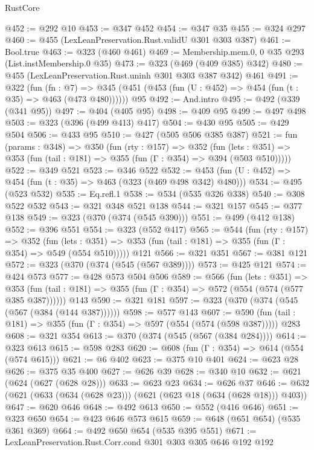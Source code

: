 \begin{lexlean}{RustCore}
\begin{coremodule}
@452 := @292 @10
@453 := @347 @452
@454 := @347 @35
@455 := @324 @297
@460 := @455 (LexLeanPreservation.Rust.validU @301 @303 @387)
@461 := Bool.true
@463 := @323 (@460 @461)
@469 := Membership.mem.{0, 0} @35 @293 (List.instMembership.{0} @35)
@473 := @323 (@469 (@409 @385) @342)
@480 := @455 (LexLeanPreservation.Rust.uninh @301 @303 @387 @342) @461
@491 := @322
    (fun (fn : @7) =>
    @345 (@451 (@453 (fun (U : @452) => @454 (fun (t : @35) => @463 (@473 @480))))))
    @95
@492 := And.intro
@495 := @492 (@339 (@341 @95))
@497 := @404 (@405 @95)
@498 := @409 @95
@499 := @497 @498
@503 := @323 (@396 (@499 @413) @417)
@504 := @430 @95
@505 := @429 @504
@506 := @433 @95
@510 := @427 (@505 @506 @385 @387)
@521 := fun (params : @348) =>
  @350
    (fun (rty : @157) =>
    @352
      (fun (lets : @351) => @353 (fun (tail : @181) => @355 (fun (Γ : @354) => @394 (@503 @510)))))
@522 := @349 @521
@523 := @346 @522
@532 := @453 (fun (U : @452) => @454 (fun (t : @35) => @463 (@323 (@469 @498 @342) @480)))
@534 := @495 (@523 @532)
@535 := Eq.refl.{1}
@538 := @534 (@535 @326 @338)
@540 := @308 @522 @532
@543 := @321 @348 @521 @138
@544 := @321 @157
@545 := @377 @138
@549 := @323 (@370 (@374 (@545 @390)))
@551 := @499 (@412 @138)
@552 := @396 @551
@554 := @323 (@552 @417)
@565 := @544
    (fun (rty : @157) =>
    @352
      (fun (lets : @351) => @353 (fun (tail : @181) => @355 (fun (Γ : @354) => @549 (@554 @510)))))
    @121
@566 := @321 @351
@567 := @381 @121
@572 := @323 (@370 (@374 (@545 (@567 @389))))
@573 := @425 @121
@574 := @424 @573
@577 := @428 @573 @504 @506
@589 := @566
    (fun (lets : @351) =>
    @353 (fun (tail : @181) => @355 (fun (Γ : @354) => @572 (@554 (@574 (@577 @385 @387))))))
    @143
@590 := @321 @181
@597 := @323 (@370 (@374 (@545 (@567 (@384 (@144 @387))))))
@598 := @577 @143
@607 := @590 (fun (tail : @181) => @355 (fun (Γ : @354) => @597 (@554 (@574 (@598 @387))))) @283
@608 := @321 @354
@613 := @370 (@374 (@545 (@567 (@384 @284))))
@614 := @323 @613
@615 := @598 @283
@620 := @608 (fun (Γ : @354) => @614 (@554 (@574 @615)))
@621 := @6 @402
@623 := @375 @10 @401
@624 := @623 @28
@626 := @375 @35 @400
@627 := @626 @39
@628 := @340 @10
@632 := @621 (@624 (@627 (@628 @28)))
@633 := @623 @23
@634 := @626 @37
@646 := @632 (@621 (@633 (@634 (@628 @23))) (@621 (@623 @18 (@634 (@628 @18))) @403))
@647 := @620 @646
@648 := @492 @613
@650 := @552 (@416 @646)
@651 := @323 @650
@654 := @423 @646 @573 @615
@659 := @648 (@651 @654) (@535 @361 @369)
@664 := @492 @650 @654 (@535 @395 @551)
@671 := LexLeanPreservation.Rust.Corr.cond @301 @303 @305 @646 @192 @192

\end{coremodule}
\end{lexlean}
